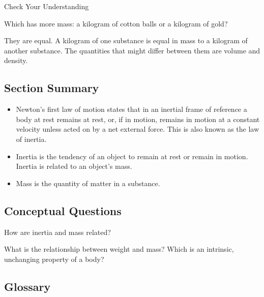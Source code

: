 \documentclass[
]{book}
\providecommand{\tightlist}{%
  \setlength{\itemsep}{0pt}\setlength{\parskip}{0pt}}
\newenvironment{conceptual-questions}{}{}
\begin{document}
\hypertarget{fs-id2448968}{}
Check Your Understanding

\leavevmode\hypertarget{fs-id3175448}{}%
Which has more mass: a kilogram of cotton balls or a kilogram of gold?

\leavevmode\hypertarget{fs-id3255910}{}%
They are equal. A kilogram of one substance is equal in mass to a
kilogram of another substance. The quantities that might differ between
them are volume and density.

\hypertarget{fs-id1651376-summary}{}
\hypertarget{section-summary-9}{%
\subsection{Section Summary}\label{section-summary-9}}

\begin{itemize}
\tightlist
\item
  {Newton's first law of motion} states that in an
  inertial frame of reference a body at rest remains at rest, or, if
  in motion, remains in motion at a constant velocity unless acted on
  by a net external force. This is also known as the {law of
  inertia}.
\item
  {Inertia}\textbf{} is the
  tendency of an object to remain at rest or remain in motion. Inertia
  is related to an object's mass.
\item
  {Mass} is the quantity of matter in a substance.
\end{itemize}

\hypertarget{fs-id2668844}{}
\begin{conceptual-questions}

\hypertarget{conceptual-questions-12}{%
\subsection{Conceptual Questions}\label{conceptual-questions-12}}

\hypertarget{fs-id1263177}{}
\leavevmode\hypertarget{fs-id1248749}{}%
How are inertia and mass related?

\hypertarget{fs-id1561865}{}
\leavevmode\hypertarget{fs-id2674431}{}%
What is the relationship between weight and mass? Which is an intrinsic,
unchanging property of a body?

\end{conceptual-questions}

\hypertarget{glossary-12}{%
\subsection{Glossary}\label{glossary-12}}
\end{document}
